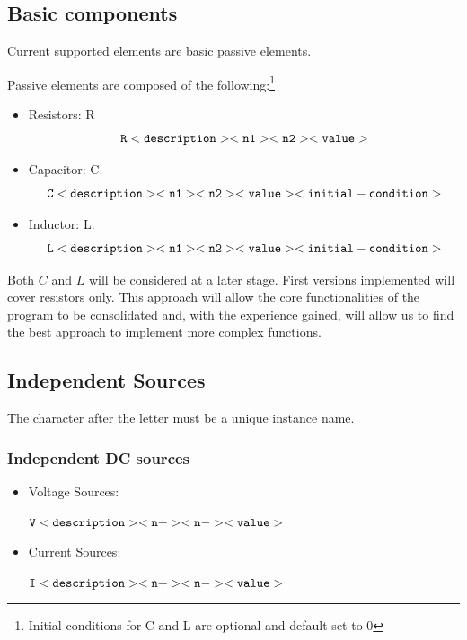 \documentclass[a4paper, titlepage]{article}
\begin{document}
    \subsection{Basic components}
    Current supported elements are basic passive elements. \par
    Passive elements are composed of the following:\footnote{Initial conditions for C and L are optional and default set to 0}
    \begin{itemize}
        \item Resistors: {\selectfont R} $$ \tt R<description> <n1> <n2> <value> $$
        \item Capacitor: {\selectfont C}. $$ \tt C<description> <n1> <n2> <value><initial-condition>$$ 
        \item Inductor: {\selectfont L}. $$ \tt L<description> <n1> <n2> <value><initial-condition>$$ 
    \end{itemize}
    Both $C$ and $L$ will be considered at a later stage. First versions implemented will cover resistors only. This
    approach will allow the core functionalities of the program to be consolidated and, with the experience gained, 
    will allow us to find the best approach to implement more complex functions.
    \vfill
    \pagebreak
    \subsection{Independent Sources}
    The character after the letter must be a unique instance name.
    \subsubsection{Independent DC sources}
    \begin{itemize}
        \item Voltage Sources: 
        \begin{center}
            $\tt V<description> <n+> <n-><value>$
        \end{center}
        \item Current Sources:
        \begin{center}
            $\tt I<description> <n+> <n-><value>$
        \end{center}
    \end{itemize}
\end{document}

